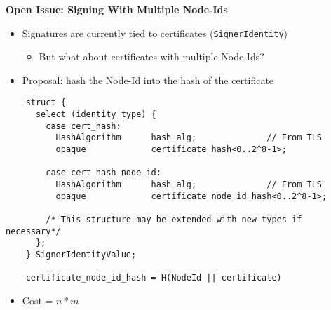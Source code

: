 \documentclass[helvetica]{seminar}
\newcommand{\heading}[1]{%
  \begin{center} 
    \large\bf 
    #1 
  \end{center} 
  \vspace{.4 in}}
\begin{document}
\begin{slide}
\heading{Open Issue: Signing With Multiple Node-Ids}

\vspace{-.4in}

\begin{itemize}
\item Signatures are currently tied to certificates (\verb^SignerIdentity^)
  \begin{itemize}
  \item But what about certificates with multiple Node-Ids?
  \end{itemize}

\item Proposal: hash the Node-Id into the hash of the certificate
\end{itemize}

{\scriptsize
\begin{verbatim}
    struct {
      select (identity_type) {
        case cert_hash:
          HashAlgorithm      hash_alg;              // From TLS
          opaque             certificate_hash<0..2^8-1>;

        case cert_hash_node_id:
          HashAlgorithm      hash_alg;              // From TLS
          opaque             certificate_node_id_hash<0..2^8-1>;

        /* This structure may be extended with new types if necessary*/
      };
    } SignerIdentityValue;

    certificate_node_id_hash = H(NodeId || certificate)
\end{verbatim}
}

\begin{itemize}
  \item Cost = $n * m$
\end{itemize}

\end{slide}
\end{document}
